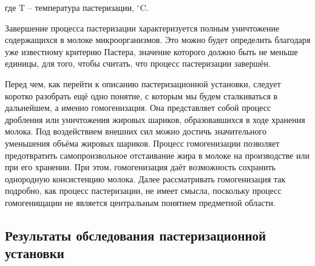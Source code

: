 {  \par \redline где T {--} температура пастеризации, $^{\circ}$C.

  \par \redline Завершение процесса пастеризации характеризуется полным уничтожение содержащихся в молоке микроорганизмов. Это можно будет определить благодаря уже известному критерию Пастера, значение которого должно быть не меньше единицы, для того, чтобы считать, что процесс пастеризации завершён.  

  \par \redline 	Перед чем, как перейти к описанию пастеризационной установки, следует коротко разобрать ещё одно понятие, с которым мы будем сталкиваться в дальнейшем, а именно гомогенизация. Она представляет собой процесс дробления или уничтожения жировых шариков, образовавшихся в ходе хранения молока. Под воздействием внешних сил можно достичь значительного уменьшения объёма жировых шариков. Процесс гомогенизации позволяет предотвратить самопроизвольное отстаивание жира в молоке на производстве или при его хранении. При этом, гомогенизация даёт возможность сохранить однородную консистенцию молока. Далее рассматривать гомогенизация так подробно, как процесс пастеризации, не имеет смысла, поскольку процесс гомогенищации не является центральным понятием предметной области. 

  \par
}

\subtitlespace

\subsection*{ 
  \gostTitleFont
   Результаты обследования пастеризационной установки
} 

\subtitlespace

